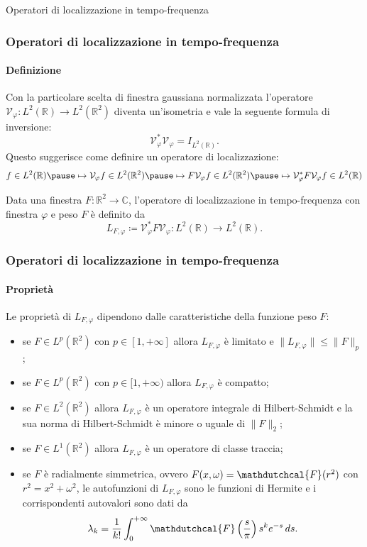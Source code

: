 \documentclass[aspectratio=141]{beamer}
\newcommand{\R}{\mathbb{R}} %
\newcommand{\V}{\mathcal{V}} %
\newcommand{\C}{\mathbb{C}} %
\begin{document}
\begin{section}{Operatori di localizzazione in tempo-frequenza}
	
	\begin{frame}
		\frametitle{Operatori di localizzazione in tempo-frequenza}
		\framesubtitle{Definizione}
		Con la particolare scelta di finestra gaussiana normalizzata l'operatore $\V_{\varphi} : L^2(\R) \rightarrow L^2(\R^2)$ diventa un'isometria e vale la seguente formula di inversione:
		\begin{equation*}
			\V_{\varphi}^* \V_{\varphi} = I_{L^2(\R)}.
		\end{equation*}
		\pause
		Questo suggerisce come definire un operatore di localizzazione:
		\begin{equation*}
			f \in L^2(\R) \pause \mapsto \V_{\varphi} f \in L^2(\R^2) \pause \mapsto F \V_{\varphi} f \in L^2(\R^2) \pause \mapsto \V_{\varphi}^* F \V_{\varphi} f \in L^2(\R)
		\end{equation*}
		\vspace{-0.5cm}
		\onslide<5-> \begin{myblock}
			Data una finestra $F: \R^2 \rightarrow \C$, l'operatore di localizzazione in tempo-frequenza con finestra $\varphi$ e peso $F$ è definito da
			\begin{equation*}
				L_{F,\varphi} \coloneqq \V_{\varphi}^* F \V_{\varphi} : L^2(\R) \rightarrow L^2(\R).
			\end{equation*}
		\end{myblock}
	\end{frame}

	\begin{frame}
		\frametitle{Operatori di localizzazione in tempo-frequenza}
		\framesubtitle{Proprietà}
		Le proprietà di $L_{F,\varphi}$ dipendono dalle caratteristiche della funzione peso $F$:
		\begin{itemize}
			\item se $F \in L^p (\R^2)$ con $p \in [1,+\infty]$ allora $L_{F,\varphi}$ è limitato e $\|L_{F,\varphi}\| \leq \|F\|_p$; \pause
			\item se $F \in L^p (\R^2)$ con $p \in [1,+\infty)$ allora $L_{F,\varphi}$ è compatto;\pause
			\item se $F \in L^2(\R^2)$ allora $L_{F,\varphi}$ è un operatore integrale di Hilbert-Schmidt e la sua norma di Hilbert-Schmidt è minore o uguale di $\|F\|_2$;\pause
			\item se $F \in L^1(\R^2)$ allora $L_{F,\varphi}$ è un operatore di classe traccia;\pause
			\item se $F$ è radialmente simmetrica, ovvero $F(x,\omega) = \mathdutchcal{F}(r^2)$ con $r^2 = x^2 + \omega^2$, le autofunzioni di $L_{F,\varphi}$ sono le funzioni di Hermite e i corrispondenti autovalori sono dati da
			\begin{equation*}
				\lambda_k = \dfrac{1}{k!} \int_0^{+\infty} \mathdutchcal{F}\left(\dfrac{s}{\pi}\right) s^k e^{-s} \, ds.
			\end{equation*}
		\end{itemize}
	\end{frame}
\end{section}
\end{document}
